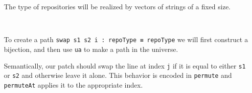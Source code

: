 The type of repositories will be realized by vectors of strings of a fixed size.

\begin{code}%
\>[0]\AgdaSpace{}%
\AgdaSymbol{:}\AgdaSpace{}%
\<%
\\
\>[0]\AgdaSpace{}%
\AgdaSymbol{=}\AgdaSpace{}%
\AgdaSpace{}%
\AgdaSpace{}%
\<%
\end{code}

To create a path \texttt{swap s1 s2 i : repoType ≡ repoType} we will first construct a
bijection, and then use \texttt{ua} to make a path in the universe.

Semantically, our patch should swap the line at index \texttt{j} if it is equal to either \texttt{s1}
or \texttt{s2} and otherwise leave it alone. This behavior is encoded in \texttt{permute} and \texttt{permuteAt}
applies it to the appropriate index.

